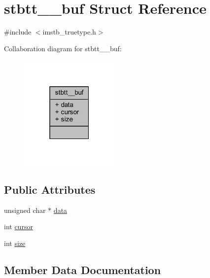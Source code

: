\hypertarget{structstbtt____buf}{}\section{stbtt\+\_\+\+\_\+buf Struct Reference}
\label{structstbtt____buf}


{\ttfamily \#include $<$imstb\+\_\+truetype.\+h$>$}



Collaboration diagram for stbtt\+\_\+\+\_\+buf\+:
\nopagebreak
\begin{figure}[H]
\begin{center}
\leavevmode
\includegraphics[width=139pt]{structstbtt____buf__coll__graph}
\end{center}
\end{figure}
\subsection*{Public Attributes}
\begin{DoxyCompactItemize}
\item 
unsigned char $\ast$ \mbox{\hyperlink{structstbtt____buf_a376d8cdacbc8295a7e88567ad52a0ac4}{data}}
\item 
int \mbox{\hyperlink{structstbtt____buf_ac047fda650726920531272c28aa354fb}{cursor}}
\item 
int \mbox{\hyperlink{structstbtt____buf_a0f6f2d06981ab4a5697233bbd0cafb5b}{size}}
\end{DoxyCompactItemize}


\subsection{Member Data Documentation}
\mbox{\label{structstbtt____buf_ac047fda650726920531272c28aa354fb}} 
